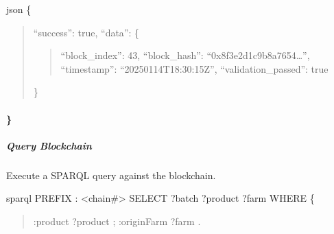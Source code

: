\documentclass[letterpaper,10pt,english]{sphinxmanual}
\begin{document}
\sphinxAtStartPar
{\color{red}\bfseries{}\textasciigrave{}\textasciigrave{}}{\color{red}\bfseries{}\textasciigrave{}}

\sphinxAtStartPar
{}
{\color{red}\bfseries{}\textasciigrave{}\textasciigrave{}}{\color{red}\bfseries{}\textasciigrave{}}json
\{
\begin{quote}

\sphinxAtStartPar
“success”: true,
“data”: \{
\begin{quote}

\sphinxAtStartPar
“block\_index”: 43,
“block\_hash”: “0x8f3e2d1c9b8a7654…”,
“timestamp”: “2025\sphinxhyphen{}01\sphinxhyphen{}14T18:30:15Z”,
“validation\_passed”: true
\end{quote}

\sphinxAtStartPar
\}
\end{quote}


\paragraph{\}}
\label{\detokenize{api/rest-api:id28}}

\subparagraph{Query Blockchain}
\label{\detokenize{api/rest-api:query-blockchain}}
\sphinxAtStartPar
Execute a SPARQL query against the blockchain.

\sphinxAtStartPar
{} 

\sphinxAtStartPar
{}

\sphinxAtStartPar
{}
{\color{red}\bfseries{}\textasciigrave{}\textasciigrave{}}{\color{red}\bfseries{}\textasciigrave{}}sparql
PREFIX : \textless{}\sphinxhyphen{}chain\#\textgreater{}
SELECT ?batch ?product ?farm WHERE \{
\begin{quote}
\begin{description}
\sphinxAtStartPar
:product ?product ;
:originFarm ?farm .

\end{description}
\end{quote}
\end{document}
